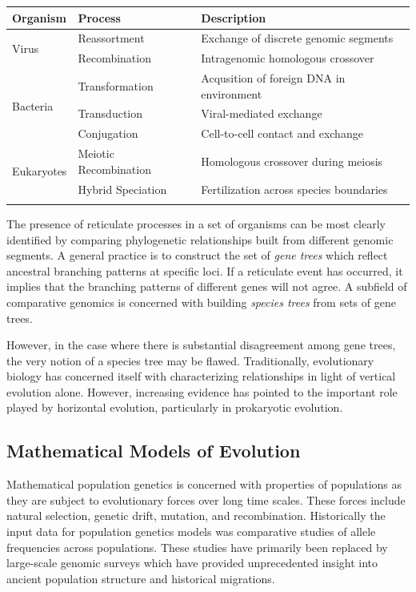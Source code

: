 \begin{tabularx}{\textwidth}{lll}
\toprule
Organism & Process & Description \\
\midrule
\multirow{2}{*}{Virus} & Reassortment & Exchange of discrete genomic segments \\
                       & Recombination & Intragenomic homologous crossover \\
\midrule
\multirow{3}{*}{Bacteria} & Transformation & Acqusition of foreign DNA in environment \\
                          & Transduction   & Viral-mediated exchange \\
                          & Conjugation    & Cell-to-cell contact and exchange \\
\midrule
\multirow{2}{*}{Eukaryotes} & Meiotic Recombination & Homologous crossover during meiosis \\
                            & Hybrid Speciation         & Fertilization across species boundaries \\
\bottomrule
\label{table:reticulation_processes}
\end{tabularx}

The presence of reticulate processes in a set of organisms can be most clearly identified by comparing phylogenetic relationships built from different genomic segments.
A general practice is to construct the set of \emph{gene trees} which reflect ancestral branching patterns at specific loci.
If a reticulate event has occurred, it implies that the branching patterns of different genes will not agree.
A subfield of comparative genomics is concerned with building \emph{species trees} from sets of gene trees.

However, in the case where there is substantial disagreement among gene trees, the very notion of a species tree may be flawed.
Traditionally, evolutionary biology has concerned itself with characterizing relationships in light of vertical evolution alone.
However, increasing evidence  has pointed to the important role played by horizontal evolution, particularly in prokaryotic evolution.

\subsection{Mathematical Models of Evolution}
\label{bg:bio:models}

Mathematical population genetics is concerned with properties of populations as they are subject to evolutionary forces over long time scales.
These forces include natural selection, genetic drift, mutation, and recombination.
Historically the input data for population genetics models was comparative studies of allele frequencies across populations.
These studies have primarily been replaced by large-scale genomic surveys which have provided unprecedented insight into ancient population structure and historical migrations.


